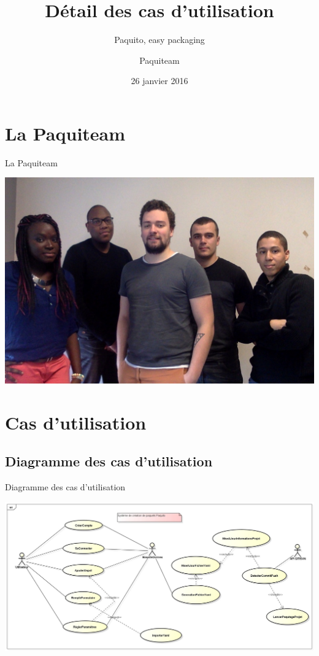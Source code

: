 \documentclass[9pt,xcolor=dvipsnames]{beamer}
\author{Paquiteam}
\title{Détail des cas d'utilisation}
\subtitle{Paquito, easy packaging}
\date{26 janvier 2016}
\begin{document}
\begin{frame}
\titlepage
\end{frame}

\section*{La Paquiteam}
\begin{frame}{La Paquiteam}
	\begin{center}
		\includegraphics[scale=0.26]{../img/paquiteam.jpg}
	\end{center}
\end{frame}


\begin{frame}
\tableofcontents
\end{frame}

\newcommand\largeur{0.15}

\section{Cas d'utilisation}
\subsection{Diagramme des cas d'utilisation}
\begin{frame}{Diagramme des cas d'utilisation}
  \begin{center}	
    \includegraphics[scale=0.15]{../img/Diagram1.jpg}
  \end{center}
\end{frame}
\end{document}

